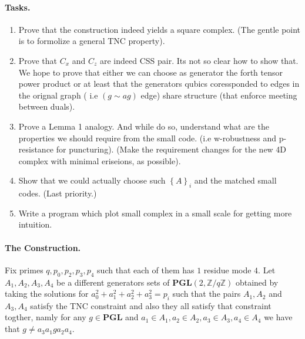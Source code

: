 \documentclass{article}
\begin{document}
\begin{multicols*}{2}
\paragraph{Tasks.}
	\begin{enumerate}
	  \item Prove that the construction indeed yields a square complex. (The gentle point is to formolize a general TNC property).  
	  \item Prove that $C_{x}$ and $C_{z}$ are indeed CSS pair. Its not so clear how to show that. We hope to prove that either we can choose as generator the forth tensor power product or at least that the generators qubics coressponded to edges in the orignal graph ( i.e $ \left( g \sim ag  \right) $ edge) share structure (that enforce meeting between duals).
	  \item Prove a Lemma 1 analogy. And while do so, understand what are the properties we should require from the small code.  
	    (i.e w-robustness and p-resistance for puncturing). 
	    (Make the requirement changes for the new 4D complex with minimal eriseions, as possible).
	  \item Show that we could actually choose such $\left\{ A \right\}_{i}$ and the matched small codes. (Last priority.) 
	  \item Write a program which plot small complex in a small scale for getting more intuition.  
	\end{enumerate}
 \paragraph{The Construction.} Fix primes $q,p_0,p_2,p_3,p_4$ such that each of them has $1 $ residue mode $4$. Let $A_{1},A_{2},A_{3},A_{4}$ be a different generators sets of $ \mathbf{PGL}(2 , \mathbb{Z} / q\mathbb{Z} )  $ 
  obtained by taking the solutions for $a_{0}^{2} + a_{1}^{2} +a_{2}^{2} +a_{3}^{2} = p_i $ such that the pairs $A_{1},A_{2}$ and $A_{3},A_{4}$ satisfy the 
  TNC constraint and also they all satisfy that constraint togther, namly for any $g \in \mathbf{PGL}$  and $a_{1}\in A_{1}, a_{2} \in A_{2}, a_{3} \in A_{3}, a_{4} \in A_{4}$ we have that $ g \neq a_{3}a_{1}ga_{2}a_{4}$. 
  

\end{multicols*}
\end{document}
